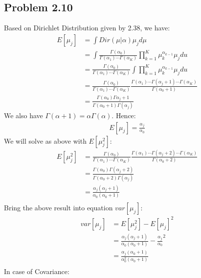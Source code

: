 \documentclass[12pt]{article}
\begin{document}
    \subsection*{Problem 2.10}
    Based on Dirichlet Distribution given by 2.38, we have:
    \begin{align*}
        E[\mu_j] & = \int{Dir(\mu|\alpha)\mu_j}d\mu \\
        & = \int{\frac{\Gamma(\alpha_0)}{\Gamma(\alpha_1)\cdots\Gamma(\alpha_K)}\prod_{k = 1}^{K}\mu_{k}^{\alpha_{k-1}}\mu_jdu} \\
        & = \frac{\Gamma(\alpha_0)}{\Gamma(\alpha_1)\cdots\Gamma(\alpha_K)}\int{\prod_{k = 1}^{K}\mu_{k}^{\alpha_{k-1}}\mu_jdu} \\
        & = \frac{\Gamma(\alpha_0)}{\Gamma(\alpha_1)\cdots\Gamma(\alpha_K)} \frac{\Gamma(\alpha_1)\cdots\Gamma(\alpha_j + 1)\cdots\Gamma(\alpha_K)}{\Gamma(\alpha_0 + 1)} \\
        & = \frac{\Gamma(\alpha_0)\Gamma{\alpha_j + 1}}{\Gamma(\alpha_0 + 1)\Gamma(\alpha_j)}
    \end{align*}
    We also have $\Gamma(\alpha + 1) = \alpha\Gamma(\alpha)$. Hence:
    \begin{align*}
        E[\mu_j] = \frac{\alpha_j}{\alpha_0}
    \end{align*}
    We will solve as above with $E[\mu_j^2]$:
    \begin{align*}
        E[\mu_j^2] & = \frac{\Gamma(\alpha_0)}{\Gamma(\alpha_1)\cdots\Gamma(\alpha_K)} \frac{\Gamma(\alpha_1)\cdots\Gamma(\alpha_j + 2)\cdots\Gamma(\alpha_K)}{\Gamma(\alpha_0 + 2)} \\
        & = \frac{\Gamma(\alpha_0)\Gamma(\alpha_j + 2)}{\Gamma(\alpha_0 + 2)\Gamma(\alpha_j)} \\
        & = \frac{\alpha_j(\alpha_j + 1)}{\alpha_0(\alpha_0 + 1)} \\
    \end{align*}
    Bring the above result into equation $var[\mu_j]$:
    \begin{align*}
        var[\mu_j] & = E[\mu_j^2] - E[\mu_j]^2 \\
        & = \frac{\alpha_j(\alpha_j + 1)}{\alpha_0(\alpha_0 + 1)} - \frac{\alpha_j}{\alpha_0}^2 \\
        & = \frac{\alpha_j(\alpha_0 + 1)}{\alpha_0^2(\alpha_0 + 1)} \\
    \end{align*}
    In case of Covariance: 
\end{document}
